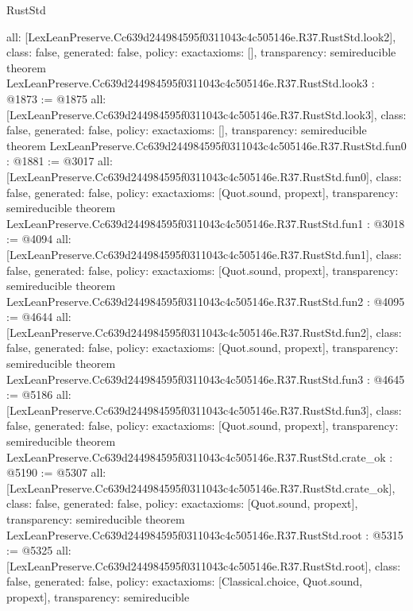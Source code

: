 \begin{lexlean}{RustStd}
\begin{coremodule}
{  all: [LexLeanPreserve.Cc639d244984595f0311043c4c505146e.R37.RustStd.look2],
  class: false,
  generated: false,
  policy: exact{axioms: []},
  transparency: semireducible
}
theorem LexLeanPreserve.Cc639d244984595f0311043c4c505146e.R37.RustStd.look3 : @1873 := @1875 {
  all: [LexLeanPreserve.Cc639d244984595f0311043c4c505146e.R37.RustStd.look3],
  class: false,
  generated: false,
  policy: exact{axioms: []},
  transparency: semireducible
}
theorem LexLeanPreserve.Cc639d244984595f0311043c4c505146e.R37.RustStd.fun0 : @1881 := @3017 {
  all: [LexLeanPreserve.Cc639d244984595f0311043c4c505146e.R37.RustStd.fun0],
  class: false,
  generated: false,
  policy: exact{axioms: [Quot.sound, propext]},
  transparency: semireducible
}
theorem LexLeanPreserve.Cc639d244984595f0311043c4c505146e.R37.RustStd.fun1 : @3018 := @4094 {
  all: [LexLeanPreserve.Cc639d244984595f0311043c4c505146e.R37.RustStd.fun1],
  class: false,
  generated: false,
  policy: exact{axioms: [Quot.sound, propext]},
  transparency: semireducible
}
theorem LexLeanPreserve.Cc639d244984595f0311043c4c505146e.R37.RustStd.fun2 : @4095 := @4644 {
  all: [LexLeanPreserve.Cc639d244984595f0311043c4c505146e.R37.RustStd.fun2],
  class: false,
  generated: false,
  policy: exact{axioms: [Quot.sound, propext]},
  transparency: semireducible
}
theorem LexLeanPreserve.Cc639d244984595f0311043c4c505146e.R37.RustStd.fun3 : @4645 := @5186 {
  all: [LexLeanPreserve.Cc639d244984595f0311043c4c505146e.R37.RustStd.fun3],
  class: false,
  generated: false,
  policy: exact{axioms: [Quot.sound, propext]},
  transparency: semireducible
}
theorem LexLeanPreserve.Cc639d244984595f0311043c4c505146e.R37.RustStd.crate_ok : @5190 := @5307 {
  all: [LexLeanPreserve.Cc639d244984595f0311043c4c505146e.R37.RustStd.crate_ok],
  class: false,
  generated: false,
  policy: exact{axioms: [Quot.sound, propext]},
  transparency: semireducible
}
theorem LexLeanPreserve.Cc639d244984595f0311043c4c505146e.R37.RustStd.root : @5315 := @5325 {
  all: [LexLeanPreserve.Cc639d244984595f0311043c4c505146e.R37.RustStd.root],
  class: false,
  generated: false,
  policy: exact{axioms: [Classical.choice, Quot.sound, propext]},
  transparency: semireducible
}


\end{coremodule}
\end{lexlean}
